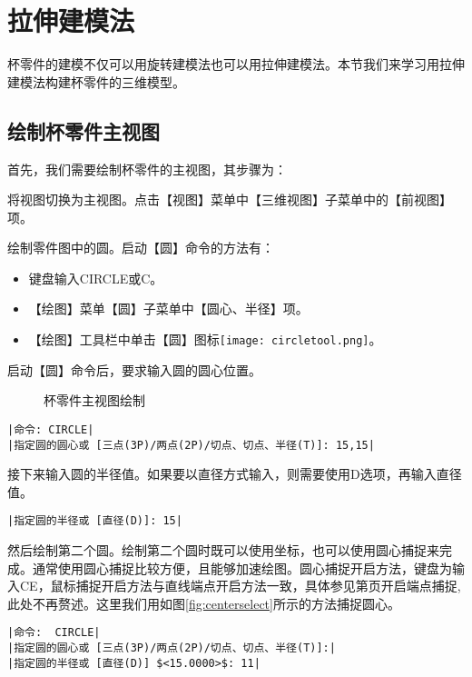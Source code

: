 \section{拉伸建模法}
杯零件的建模不仅可以用旋转建模法也可以用拉伸建模法。本节我们来学习用拉伸建模法构建杯零件的三维模型。
\subsection{绘制杯零件主视图}
首先，我们需要绘制杯零件的主视图，其步骤为：
\begin{procedure}
\item 将视图切换为主视图。点击【视图】菜单中【三维视图】子菜单中的【前视图】项。
\item 绘制零件图中的圆。启动【圆】命令的方法有：
\begin{itemize}
\item 键盘输入CIRCLE或C。
\item 【绘图】菜单【圆】子菜单中【圆心、半径】项。
\item 【绘图】工具栏中单击【圆】图标\texttt{[image: circletool.png]}。
\end{itemize}
启动【圆】命令后，要求输入圆的圆心位置。
\begin{figure}[htbp]
\centering
{}\hspace{20pt}
\caption{杯零件主视图绘制}
\end{figure}
\begin{lstlisting}
|命令: CIRCLE|
|指定圆的圆心或 [三点(3P)/两点(2P)/切点、切点、半径(T)]: 15,15|
\end{lstlisting}
接下来输入圆的半径值。如果要以直径方式输入，则需要使用D选项，再输入直径值。
\begin{lstlisting}
|指定圆的半径或 [直径(D)]: 15|
\end{lstlisting}
然后绘制第二个圆。绘制第二个圆时既可以使用坐标，也可以使用圆心捕捉来完成。通常使用圆心捕捉比较方便，且能够加速绘图。圆心捕捉开启方法，键盘为输入CE，鼠标捕捉开启方法与直线端点开启方法一致，具体参见第\pageref{fig:duixiangbuzuomen2}页开启端点捕捉,此处不再赘述。这里我们用如图\ref{fig:centerselect}所示的方法捕捉圆心。
\begin{lstlisting}
|命令:  CIRCLE|
|指定圆的圆心或 [三点(3P)/两点(2P)/切点、切点、半径(T)]:|
|指定圆的半径或 [直径(D)] $<15.0000>$: 11|
\end{lstlisting}

\end{procedure}

\endinput